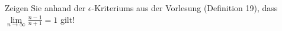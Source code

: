 \item Zeigen Sie anhand der $\epsilon$-Kriteriums aus der Vorlesung (Definition 19), dass $\lim\limits_{n\to\infty} \frac{n-1}{n+1} = 1$ gilt!